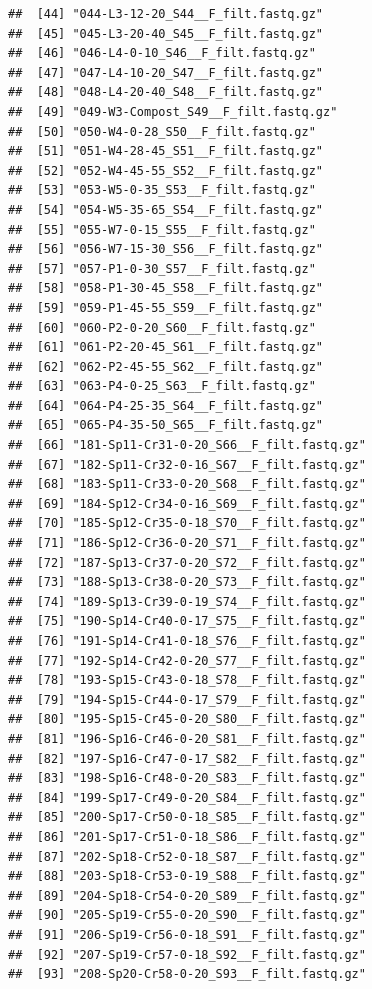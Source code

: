 \documentclass[]{article}
\begin{document}
\begin{verbatim}
##  [44] "044-L3-12-20_S44__F_filt.fastq.gz"       
##  [45] "045-L3-20-40_S45__F_filt.fastq.gz"       
##  [46] "046-L4-0-10_S46__F_filt.fastq.gz"        
##  [47] "047-L4-10-20_S47__F_filt.fastq.gz"       
##  [48] "048-L4-20-40_S48__F_filt.fastq.gz"       
##  [49] "049-W3-Compost_S49__F_filt.fastq.gz"     
##  [50] "050-W4-0-28_S50__F_filt.fastq.gz"        
##  [51] "051-W4-28-45_S51__F_filt.fastq.gz"       
##  [52] "052-W4-45-55_S52__F_filt.fastq.gz"       
##  [53] "053-W5-0-35_S53__F_filt.fastq.gz"        
##  [54] "054-W5-35-65_S54__F_filt.fastq.gz"       
##  [55] "055-W7-0-15_S55__F_filt.fastq.gz"        
##  [56] "056-W7-15-30_S56__F_filt.fastq.gz"       
##  [57] "057-P1-0-30_S57__F_filt.fastq.gz"        
##  [58] "058-P1-30-45_S58__F_filt.fastq.gz"       
##  [59] "059-P1-45-55_S59__F_filt.fastq.gz"       
##  [60] "060-P2-0-20_S60__F_filt.fastq.gz"        
##  [61] "061-P2-20-45_S61__F_filt.fastq.gz"       
##  [62] "062-P2-45-55_S62__F_filt.fastq.gz"       
##  [63] "063-P4-0-25_S63__F_filt.fastq.gz"        
##  [64] "064-P4-25-35_S64__F_filt.fastq.gz"       
##  [65] "065-P4-35-50_S65__F_filt.fastq.gz"       
##  [66] "181-Sp11-Cr31-0-20_S66__F_filt.fastq.gz" 
##  [67] "182-Sp11-Cr32-0-16_S67__F_filt.fastq.gz" 
##  [68] "183-Sp11-Cr33-0-20_S68__F_filt.fastq.gz" 
##  [69] "184-Sp12-Cr34-0-16_S69__F_filt.fastq.gz" 
##  [70] "185-Sp12-Cr35-0-18_S70__F_filt.fastq.gz" 
##  [71] "186-Sp12-Cr36-0-20_S71__F_filt.fastq.gz" 
##  [72] "187-Sp13-Cr37-0-20_S72__F_filt.fastq.gz" 
##  [73] "188-Sp13-Cr38-0-20_S73__F_filt.fastq.gz" 
##  [74] "189-Sp13-Cr39-0-19_S74__F_filt.fastq.gz" 
##  [75] "190-Sp14-Cr40-0-17_S75__F_filt.fastq.gz" 
##  [76] "191-Sp14-Cr41-0-18_S76__F_filt.fastq.gz" 
##  [77] "192-Sp14-Cr42-0-20_S77__F_filt.fastq.gz" 
##  [78] "193-Sp15-Cr43-0-18_S78__F_filt.fastq.gz" 
##  [79] "194-Sp15-Cr44-0-17_S79__F_filt.fastq.gz" 
##  [80] "195-Sp15-Cr45-0-20_S80__F_filt.fastq.gz" 
##  [81] "196-Sp16-Cr46-0-20_S81__F_filt.fastq.gz" 
##  [82] "197-Sp16-Cr47-0-17_S82__F_filt.fastq.gz" 
##  [83] "198-Sp16-Cr48-0-20_S83__F_filt.fastq.gz" 
##  [84] "199-Sp17-Cr49-0-20_S84__F_filt.fastq.gz" 
##  [85] "200-Sp17-Cr50-0-18_S85__F_filt.fastq.gz" 
##  [86] "201-Sp17-Cr51-0-18_S86__F_filt.fastq.gz" 
##  [87] "202-Sp18-Cr52-0-18_S87__F_filt.fastq.gz" 
##  [88] "203-Sp18-Cr53-0-19_S88__F_filt.fastq.gz" 
##  [89] "204-Sp18-Cr54-0-20_S89__F_filt.fastq.gz" 
##  [90] "205-Sp19-Cr55-0-20_S90__F_filt.fastq.gz" 
##  [91] "206-Sp19-Cr56-0-18_S91__F_filt.fastq.gz" 
##  [92] "207-Sp19-Cr57-0-18_S92__F_filt.fastq.gz" 
##  [93] "208-Sp20-Cr58-0-20_S93__F_filt.fastq.gz" 

\end{verbatim}
\end{document}
